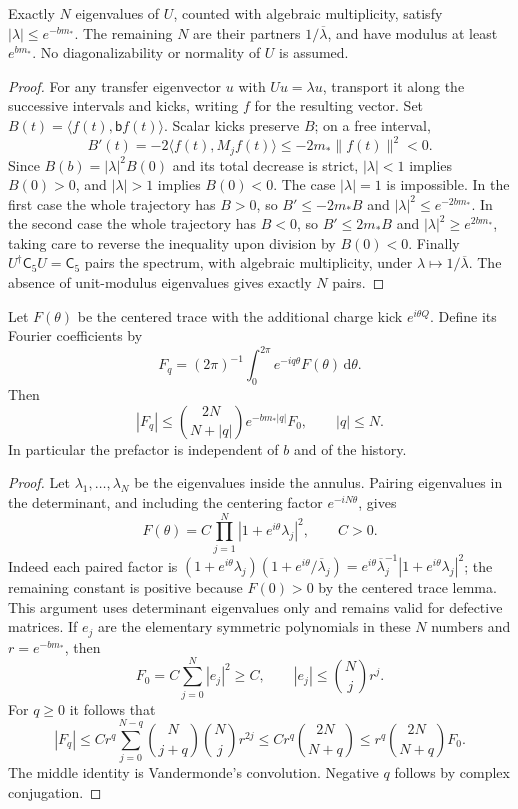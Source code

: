 \begin{lemma}
\label{lem:mass-gap-annulus}
Exactly $N$ eigenvalues of $U$, counted with algebraic multiplicity,
satisfy $|\lambda|\le e^{-bm_*}$. The remaining $N$ are their partners
$1/\overline\lambda$, and have modulus at least $e^{bm_*}$.
No diagonalizability or normality of $U$ is assumed.
\end{lemma}
\begin{proof}
For any transfer eigenvector $u$ with $Uu=\lambda u$, transport it along
the successive intervals and kicks, writing $f$ for the resulting vector.
Set $B(t)=\langle f(t),\mathsf b f(t)\rangle$. Scalar kicks preserve $B$;
on a free interval,
\[
 B'(t)=-2\langle f(t),M_jf(t)\rangle
 \le-2m_*\|f(t)\|^2<0.
\]
Since $B(b)=|\lambda|^2B(0)$ and its total decrease is strict,
$|\lambda|<1$ implies $B(0)>0$, and $|\lambda|>1$ implies $B(0)<0$.
The case $|\lambda|=1$ is impossible. In the first case the whole
trajectory has $B>0$, so $B'\le-2m_*B$ and
$|\lambda|^2\le e^{-2bm_*}$. In the second case the whole trajectory
has $B<0$, so $B'\le2m_*B$ and
$|\lambda|^2\ge e^{2bm_*}$, taking care to reverse the inequality upon
division by $B(0)<0$.
Finally $U^\dagger\mathsf C_5U=\mathsf C_5$ pairs the spectrum, with
algebraic multiplicity, under $\lambda\mapsto1/\overline\lambda$.
The absence of unit-modulus eigenvalues gives exactly $N$ pairs.
\end{proof}

\begin{lemma}
\label{lem:mass-gap-fourier}
Let $F(\theta)$ be the centered trace with the additional charge
kick $e^{i\theta Q}$. Define its Fourier coefficients by
\[
F_q=(2\pi)^{-1}\int_0^{2\pi}e^{-iq\theta}F(\theta)\,\mathrm d\theta .
\]
Then
\begin{equation}
 |F_q|\le\binom{2N}{N+|q|}e^{-bm_*|q|}F_0,
 \qquad |q|\le N.
 \label{eq:mass-gap-fourier}
\end{equation}
In particular the prefactor is independent of $b$ and of the history.
\end{lemma}
\begin{proof}
Let $\lambda_1,\ldots,\lambda_N$ be the eigenvalues inside the annulus.
Pairing eigenvalues in the determinant, and including the centering
factor $e^{-iN\theta}$, gives
\[
 F(\theta)=C\prod_{j=1}^N|1+e^{i\theta}\lambda_j|^2,
 \qquad C>0.
\]
Indeed each paired factor is
$(1+e^{i\theta}\lambda_j)(1+e^{i\theta}/\overline\lambda_j)
=e^{i\theta}\overline\lambda_j^{-1}|1+e^{i\theta}\lambda_j|^2$;
the remaining constant is positive because $F(0)>0$ by the centered
trace lemma. This argument uses determinant eigenvalues only and remains
valid for defective matrices.
If $e_j$ are the elementary symmetric polynomials in these $N$ numbers
and $r=e^{-bm_*}$, then
\[
 F_0=C\sum_{j=0}^N|e_j|^2\ge C,\qquad
 |e_j|\le\binom Nj r^j.
\]
For $q\ge0$ it follows that
\[
 |F_q|\le C r^q\sum_{j=0}^{N-q}\binom N{j+q}\binom Nj r^{2j}
 \le C r^q\binom{2N}{N+q}\le r^q\binom{2N}{N+q}F_0.
\]
The middle identity is Vandermonde's convolution. Negative $q$ follows
by complex conjugation.
\end{proof}

